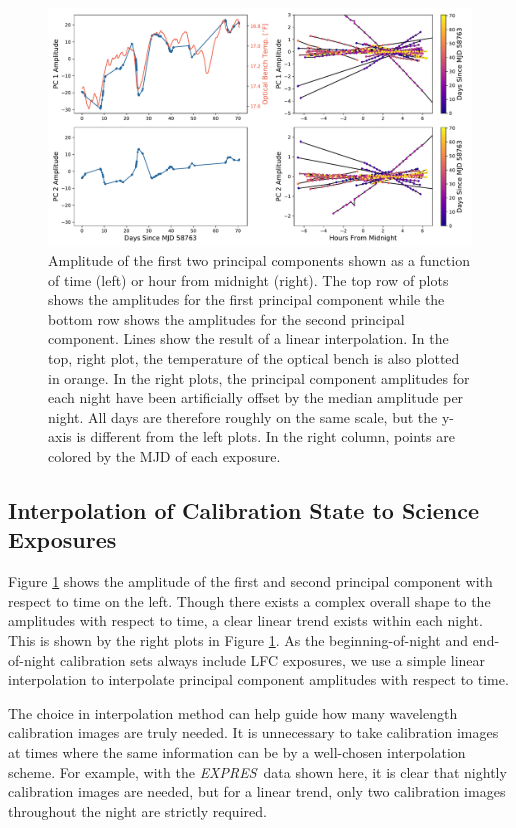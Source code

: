 \documentclass[twocolumn,table,xcolor,trackchanges]{aastex63}
\newcommand{\project}[1]{\textsl{#1}}
\newcommand{\acronym}[1]{{\small{#1}}}
\newcommand{\expres}{\project{\acronym{EXPRES}}}
\begin{document}
\label{sec:choice_avt}
\begin{figure}[t]
\centering
\includegraphics[width=\textwidth]{Figures/pcAs_byDay.pdf}
\caption{Amplitude of the first two principal components shown as a function of time (left) or hour from midnight (right).  The top row of plots shows the amplitudes for the first principal component while the bottom row shows the amplitudes for the second principal component.  Lines show the result of a linear interpolation.  In the top, right plot, the temperature of the optical bench is also plotted in orange.  In the right plots, the principal component amplitudes for each night have been artificially offset by the median amplitude per night.  All days are therefore roughly on the same scale, but the y-axis is different from the left plots.  In the right column, points are colored by the MJD of each exposure.}
\label{fig:nightlyVariation}
\end{figure} 

\subsection{Interpolation of Calibration State to Science Exposures}
Figure \ref{fig:nightlyVariation} shows the amplitude of the first and second principal component with respect to time on the left.  Though there exists a complex overall shape to the amplitudes with respect to time, a clear linear trend exists within each night.  This is shown by the right plots in Figure  \ref{fig:nightlyVariation}.  As the beginning-of-night and end-of-night calibration sets always include LFC exposures, we use a simple linear interpolation to interpolate principal component amplitudes with respect to time.

The choice in interpolation method can help guide how many wavelength calibration images are truly needed.  It is unnecessary to take calibration images at times where the same information can be  by a well-chosen interpolation scheme.  For example, with the \expres\ data shown here, it is clear that nightly calibration images are needed, but for a linear trend, only two calibration images throughout the night are strictly required.
\end{document}
